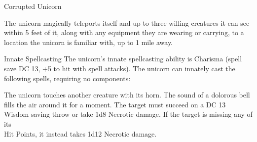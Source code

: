 \begin{DndMonster}[width=0.5\textwidth]{Corrupted Unicorn\label{monster:CorruptedUnicorn}}
	\DndMonsterAttack[
		name			= Horn,
		distance		= melee,	%
		mod				= +6,
		reach			= 5,
		targets			= one target,
		dmg				= \DndDice{1d8 + 4},
		dmg-type		= Piercing,
	]
	
	The unicorn magically teleports itself and up to three willing creatures it can see within 5 feet of it, along with any equipment they are wearing or carrying, to a location the unicorn is familiar with, up to 1 mile away.
	
	\begin{DndMonsterSpells}
		\item[Innate Spellcasting] The unicorn's innate spellcasting ability is Charisma (spell save DC 13, +5 to hit with spell attacks). The unicorn can innately cast the following spells, requiring no components:
	\end{DndMonsterSpells}
	
	The unicorn touches another creature with its horn. The sound of a dolorous bell fills the air around it for a moment. The target must succeed on a DC 13 Wisdom saving throw or take 1d8 Necrotic damage. If the target is missing any of its\\Hit Points, it instead takes 1d12 Necrotic damage.
\end{DndMonster}